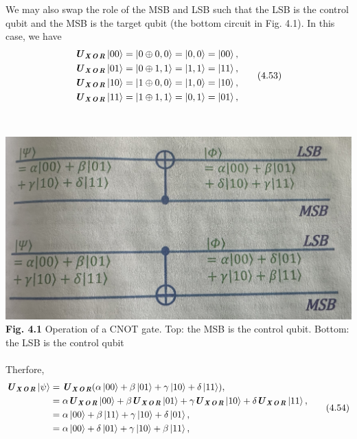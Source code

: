 \documentclass{article}
\newcommand{\bfit}[1]{\textbf{\textit{#1}}}
\begin{document}
We may also swap the role of the MSB and LSB such that the LSB is the
control qubit and the MSB is the target qubit (the bottom circuit in Fig. 4.1).
In this case, we have
\begin{align} \label{eq 4.53}
    \begin{split}
       \bfit{U}_{\bfit{X\! O\! R}}\ket{00}=\ket{0\oplus0,0}=\ket{0,0}=\ket{00},\\
        \bfit{U}_{\bfit{X\! O\! R}}\ket{01}=\ket{0\oplus1,1}=\ket{1,1}=\ket{11},\\
        \bfit{U}_{\bfit{X\! O\! R}}\ket{10}=\ket{1\oplus0,0}=\ket{1,0}=\ket{10},\\
        \bfit{U}_{\bfit{X\! O\! R}}\ket{11}=\ket{1\oplus1,1}=\ket{0,1}=\ket{01},\\
    \end{split}\tag{4.53}
\end{align}
\\\\
\includegraphics[scale=0.4]{Fig 4.1.jpeg}\\
\textbf{Fig. 4.1} Operation of a CNOT gate. Top: the MSB is the control qubit.
Bottom: the LSB is the control qubit
\\\\
Therfore,
\begin{align}\label{eq 4.54}
    \begin{split}
         \bfit{U}_{\bfit{X\! O\! R}}\ket{\psi}&=\bfit{U}_{\bfit{X\! O\! R}}(\alpha\ket{00}+\beta\ket{01}+\gamma\ket{10}+\delta\ket{11}),\\
        &= \alpha\bfit{U}_{\bfit{X\! O\! R}}\ket{00}+\beta\bfit{U}_{\bfit{X\! O\! R}}\ket{01}+\gamma\bfit{U}_{\bfit{X\! O\! R}}\ket{10}+\delta\bfit{U}_{\bfit{X\! O\! R}}\ket{11},\\
        &= \alpha\ket{00}+\beta\ket{11}+\gamma\ket{10}+\delta\ket{01},\\
        &= \alpha\ket{00}+\delta\ket{01}+\gamma\ket{10}+\beta\ket{11},\\ 
    \end{split} \tag{4.54}
\end{align}
\end{document}
